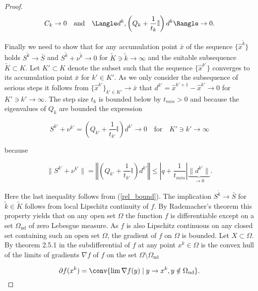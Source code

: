 \begin{proof}
	\begin{equation*}
		C_k \to 0 \quad \text{and} \quad \Langle d^k,\left(Q_k+\frac{1}{t_k}\mathbb{I}\right)d^k\Rangle \to 0.
	\end{equation*}
	
	Finally we need to show that for any accumulation point \(\bar{x}\) of the sequence \(\{\hat{x}^{\tilde{k}}\}\) holds \(S^{\tilde{k}} \to \bar{S}\) and \(S^{\tilde{k}}+\nu^{\tilde{k}} \to 0\) for \(\tilde{K} \ni {\tilde{k}} \to \infty\) and the suitable subsequence \(\tilde{K} \subset K\).
Let \({K'} \subset K\) denote the subset such that the sequence \(\{\hat{x}^{k'}\}\) converges to its accumulation point \(\bar{x}\) for \(k' \in K'\). %
As we only consider the subsequence of serious steps it follows from \(\{\hat{x}^{k'}\}_{k' \in K'} \to \bar{x}\) that  \(d^{{k'}} = \hat{x}^{{k'}+1}-\hat{x}^{{k'}} \to 0\) for \({K'} \ni {k'} \to \infty \). The step size \(t_k\) is bounded below by \(t_{min} > 0\) and because the eigenvalues of \(Q_k\) are bounded the expression 
	
	\begin{equation*}
	 S^{{k'}} + \nu^{{k'}} = \left(Q_{{k'}}+\frac{1}{t_{{k'}}}\mathbb{I} \right)d^{{k'}}  \to 0 \quad \text{for} \quad {K'} \ni {k'} \to \infty
	\end{equation*}
	
	because 
	
	\[ \lVert S^{{k'}} + \nu^{{k'}} \rVert = \left\Vert\left(Q_{{k'}}+\frac{1}{t_{{k'}}}\mathbb{I}\right)d^{{k'}} \right\Vert \leq \left \vert q + \frac{1}{t_{min}}\right\vert \underbrace{\|d^{{k'}}\|}_{\to 0}.\]
	
	Here the last inequality follows from (\ref{rel_bound}).
	The implication \(S^{\tilde{k}} \to \bar{S}\) for \({\tilde{k}} \in \tilde{K}\) follows from local Lipschitz continuity of \(f\).
	By Rademacher's theorem this property yields that on any open set \(\Omega\) the function \(f\) is differentiable except on a set \(\Omega_{\text{nd}}\) of zero Lebesgue measure. As \(f\) is also Lipschitz continuous on any closed set containing such an open set \(\Omega\), the gradient of \(f\) on \(\Omega\) is bounded.
	Let \(X \subset \Omega\). By theorem 2.5.1 in \cite[p. 63]{Clarke1990} the subdifferential of \(f\) at any point \(x^k \in \Omega\) is the convex hull of the limits of gradients \(\nabla f\) of \(f\) on the set \(\Omega\setminus \Omega_{\text{nd}}\)
	
		\[ \partial f(x^k) = \conv\{\lim \nabla f(y) \mid y \to x^k, y \notin \Omega_{\text{nd}}\}. \]
		

\end{proof}
